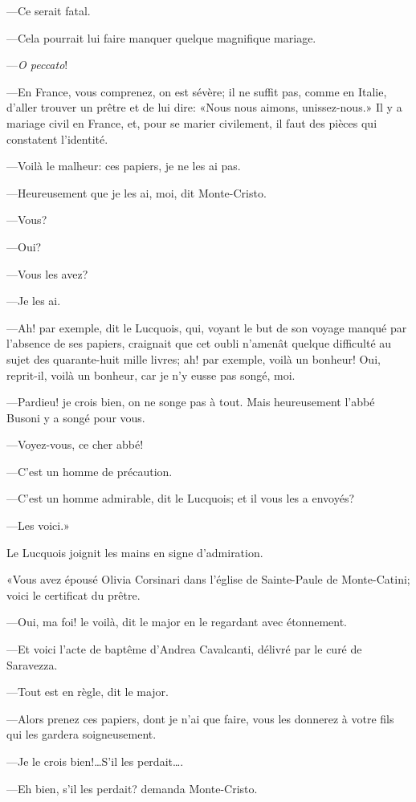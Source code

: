 —Ce serait fatal. 

—Cela pourrait lui faire manquer quelque magnifique mariage. 

—\textit{O peccato}! 

—En France, vous comprenez, on est sévère; il ne suffit pas, comme en Italie, d'aller trouver un prêtre et de lui dire: «Nous nous aimons, unissez-nous.» Il y a mariage civil en France, et, pour se marier civilement, il faut des pièces qui constatent l'identité. 

—Voilà le malheur: ces papiers, je ne les ai pas. 

—Heureusement que je les ai, moi, dit Monte-Cristo. 

—Vous? 

—Oui? 

—Vous les avez? 

—Je les ai. 

—Ah! par exemple, dit le Lucquois, qui, voyant le but de son voyage manqué par l'absence de ses papiers, craignait que cet oubli n'amenât quelque difficulté au sujet des quarante-huit mille livres; ah! par exemple, voilà un bonheur! Oui, reprit-il, voilà un bonheur, car je n'y eusse pas songé, moi. 

—Pardieu! je crois bien, on ne songe pas à tout. Mais heureusement l'abbé Busoni y a songé pour vous. 

—Voyez-vous, ce cher abbé! 

—C'est un homme de précaution. 

—C'est un homme admirable, dit le Lucquois; et il vous les a envoyés? 

—Les voici.» 

Le Lucquois joignit les mains en signe d'admiration. 

«Vous avez épousé Olivia Corsinari dans l'église de Sainte-Paule de Monte-Catini; voici le certificat du prêtre. 

—Oui, ma foi! le voilà, dit le major en le regardant avec étonnement. 

—Et voici l'acte de baptême d'Andrea Cavalcanti, délivré par le curé de Saravezza. 

—Tout est en règle, dit le major. 

—Alors prenez ces papiers, dont je n'ai que faire, vous les donnerez à votre fils qui les gardera soigneusement. 

—Je le crois bien!\dots S'il les perdait\dots. 

—Eh bien, s'il les perdait? demanda Monte-Cristo. 

